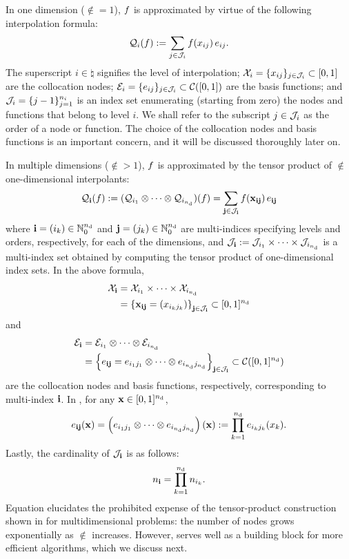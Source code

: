 In one dimension ($\nin = 1$), $f$ is approximated by virtue of the following
interpolation formula:
\begin{equation} \elab{tensor-1d}
  \tensor{i}(\f) := \sum_{j \in \index_i} \f(\x_{ij}) \, \e_{ij}.
\end{equation}
The superscript $i \in \natural$ signifies the level of interpolation; $\mathcal{X}_i =
\{ x_{ij} \}_{j \in \mathcal{J}_i} \subset [0, 1]$ are the collocation nodes; $\mathcal{E}_i
= \{ e_{ij} \}_{j \in \mathcal{J}_i} \subset \mathcal{C}([0, 1])$ are the basis
functions; and $\mathcal{J}_i = \{ j - 1 \}_{j = 1}^{n_i}$ is an index set
enumerating (starting from zero) the nodes and functions that belong to level
$i$. We shall refer to the subscript $j \in \mathcal{J}_i$ as the order of a node or
function. The choice of the collocation nodes and basis functions is an
important concern, and it will be discussed thoroughly later on.

In multiple dimensions ($\nin > 1$), $f$ is approximated by the tensor product
of $\nin$ one-dimensional interpolants:
\begin{equation} \elab{tensor}
  \tensor{\vi}(\f) := (\tensor{i_1} \otimes \cdots \otimes \tensor{i_\nin})(\f) = \sum_{\vj \in \index_\vi} \f(\vx_{\vi\vj}) \, \e_{\vi\vj}
\end{equation}
where $\mathbf{i} = (i_k) \in \mathbb{N}_0^{n_\text{d}}$ and $\mathbf{j} = (j_k) \in \mathbb{N}_0^{n_\text{d}}$ are
multi-indices specifying levels and orders, respectively, for each of the
dimensions, and $\mathcal{J}_{\mathbf{i}} := \mathcal{J}_{i_1} \times \cdots \times
\mathcal{J}_{i_{n_\text{d}}}$ is a multi-index set obtained by computing the tensor product
of one-dimensional index sets. In the above formula,
\begin{align}
  \X_\vi &= \X_{i_1} \times \cdots \times \X_{i_\nin} \elab{collocation-nodes} \\
         &= \left\{ \vx_{\vi\vj} = (\x_{i_k j_k}) \right\}_{\vj \in \index_\vi} \subset [0, 1]^\nin \nonumber
\end{align}
and
\begin{align}
  \E_\vi &= \E_{i_1} \otimes \cdots \otimes \E_{i_\nin} \elab{basis-functions} \\
         &= \left\{ \e_{\vi\vj} = \e_{i_1 j_1} \otimes \cdots \otimes \e_{i_\nin j_\nin} \right\}_{\vj \in \index_\vi} \subset \continuous([0, 1]^\nin) \nonumber
\end{align}
are the collocation nodes and basis functions, respectively, corresponding to
multi-index $\mathbf{i}$. In , for any $\mathbf{x} \in [0, 1]^{n_\text{d}}$,
\[
  e_{\mathbf{i}\mathbf{j}}(\mathbf{x}) = \left(e_{i_1 j_1} \otimes \cdots \otimes e_{i_{n_\text{d}} j_{n_\text{d}}}\right)(\mathbf{x}) := \prod_{k = 1}^{n_\text{d}} e_{i_k j_k}(x_k).
\]
Lastly, the cardinality of $\mathcal{J}_{\mathbf{i}}$ is as follows:
\begin{equation} \elab{tensor-cardinality}
  \n_\vi = \prod_{k = 1}^\nin \n_{i_k}.
\end{equation}
Equation  elucidates the prohibited expense of the
tensor-product construction shown in  for multidimensional
problems: the number of nodes grows exponentially as $\nin$ increases. However,
 serves well as a building block for more efficient algorithms,
which we discuss next.

